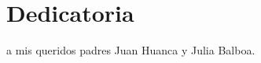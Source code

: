 \cleardoublepage
\hypertarget{Dedicatoria}{}

\chapter*{Dedicatoria}

a mis queridos padres Juan Huanca y Julia Balboa.

